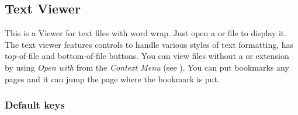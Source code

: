 \subsection{Text Viewer}
This is a Viewer for text files with word wrap. Just open a  or  file to
display it. The text viewer features controls to handle various styles of text
formatting, has top{}-of{}-file and bottom{}-of{}-file buttons. You can view
files without a  or  extension by using \emph{Open with} from the
\emph{Context Menu} (see ). You can put bookmarks any pages 
and it can jump the page where the bookmark is put.

\subsubsection{Default keys}

